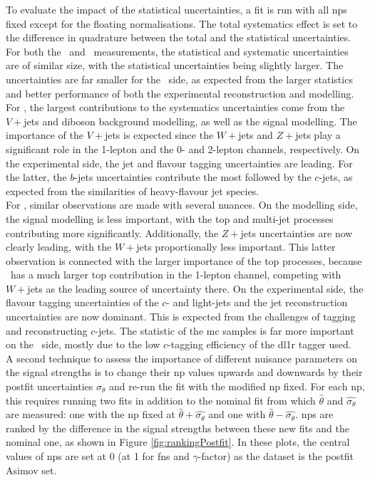 To evaluate the impact of the statistical uncertainties, a fit is run with all \glspl{np} fixed except for the floating normalisations. The total systematics effect is set to the difference in quadrature between the total and the statistical uncertainties. For both the \vhb\ and \vhc\ measurements, the statistical and systematic uncertainties are of similar size, with the statistical uncertainties being slightly larger. The uncertainties are far smaller for the \vhb\ side, as expected from the larger statistics and better performance of both the experimental reconstruction and modelling. For \vhb, the largest contributions to the systematics uncertainties come from the $V+$jets and diboson background modelling, as well as the signal modelling. The importance of the $V+$jets is expected since the $W+$jets and $Z+$jets play a significant role in the 1-lepton and the 0- and 2-lepton channels, respectively. On the experimental side, the jet and flavour tagging uncertainties are leading. For the latter, the $b$-jets uncertainties contribute the most followed by the $c$-jets, as expected from the similarities of heavy-flavour jet species. \\

For \vhc, similar observations are made with several nuances. On the modelling side, the signal modelling is less important, with the top and multi-jet processes contributing more significantly. Additionally, the $Z+$jets uncertainties are now clearly leading, with the $W+$jets proportionally less important. This latter observation is connected with the larger importance of the top processes, because \vhc\ has a much larger top contribution in the 1-lepton channel, competing with $W+$jets as the leading source of uncertainty there. On the experimental side, the flavour tagging uncertainties of the $c$- and light-jets and the jet reconstruction uncertainties are now dominant. This is expected from the challenges of tagging and reconstructing $c$-jets. The statistic of the \gls{mc} samples is far more important on the \vhc\ side, mostly due to the low $c$-tagging efficiency of the \gls{dl1r} tagger used. \\

A second technique to assess the importance of different nuisance parameters on the signal strengths is to change their \gls{np} values upwards and downwards by their postfit uncertainties $\sigma_{\theta}$ and re-run the fit with the modified \gls{np} fixed. For each \gls{np}, this requires running two fits in addition to the nominal fit from which $\hat{\theta}$ and $\hat{\sigma_{\theta}}$ are measured: one with the \gls{np} fixed at $\hat{\theta} + \hat{\sigma_{\theta}}$ and one with $\hat{\theta} - \hat{\sigma_{\theta}}$. \glspl{np} are ranked by the difference in the signal strengths between these new fits and the nominal one, as shown in Figure \ref{fig:rankingPostfit}. In these plots, the central values of \glspl{np} are set at 0 (at 1 for \glspl{fn} and $\gamma$-factor) as the dataset is the postfit Asimov set. \\

